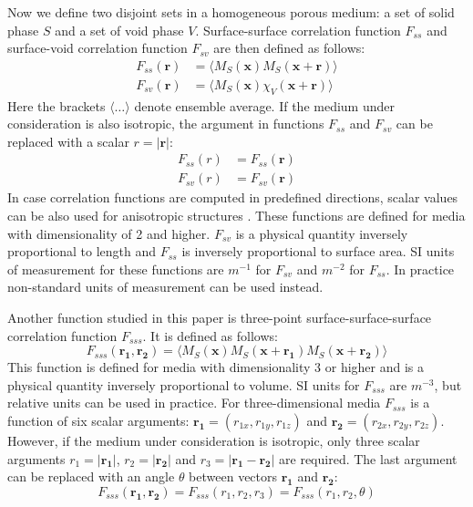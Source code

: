 \documentclass[1p]{elsarticle}
\begin{document}
Now we define two disjoint sets in a homogeneous porous medium: a set of solid
phase $S$ and a set of void phase $V$. Surface-surface correlation function
$F_{ss}$ and surface-void correlation function $F_{sv}$ are then defined as
follows: \cite{Torquato_book}
\begin{align}
  F_{ss}(\bm{r}) &= \langle M_S(\bm{x}) M_S(\bm{x} + \bm{r}) \rangle \label{eq:fss} \\
  F_{sv}(\bm{r}) &= \langle M_S(\bm{x}) \chi_V(\bm{x} + \bm{r}) \rangle
  \label{eq:fsv}
\end{align}
Here the brackets $\langle \dots \rangle$ denote ensemble average. If the medium
under consideration is also isotropic, the argument in functions $F_{ss}$ and
$F_{sv}$ can be replaced with a scalar $r = |\bm{r}|$:
\begin{align}
  F_{ss}(r) &= F_{ss}(\bm{r}) \\
  F_{sv}(r) &= F_{sv}(\bm{r})
\end{align}
In case correlation functions are computed in predefined directions, scalar
values can be also used for anisotropic structures
\cite{jiao2014chawla,EPL1}. These functions are defined for media with
dimensionality of 2 and higher. $F_{sv}$ is a physical quantity inversely
proportional to length and $F_{ss}$ is inversely proportional to surface
area. SI units of measurement for these functions are $m^{-1}$ for $F_{sv}$
and $m^{-2}$ for $F_{ss}$. In practice non-standard units of measurement can be
used instead.

Another function studied in this paper is three-point surface-surface-surface
correlation function $F_{sss}$. It is defined as follows:
\begin{equation}
  F_{sss}(\bm{r_1}, \bm{r_2}) = \langle M_S(\bm{x}) M_S(\bm{x} + \bm{r_1})
  M_S(\bm{x} + \bm{r_2}) \rangle
  \label{eq:fsss}
\end{equation}
This function is defined for media with dimensionality 3 or higher and is a
physical quantity inversely proportional to volume. SI units for $F_{sss}$ are
$m^{-3}$, but relative units can be used in practice. For three-dimensional media
$F_{sss}$ is a function of six scalar arguments:
$\bm{r_1} = (r_{1x}, r_{1y}, r_{1z})$ and $\bm{r_2} = (r_{2x}, r_{2y}, r_{2z})$.
However, if the medium under consideration is isotropic, only three scalar
arguments $r_1 = |\bm{r_1}|$, $r_2 = |\bm{r_2}|$ and $r_3 = |\bm{r_1} - \bm{r_2}|$
are required. The last argument can be replaced with an angle $\theta$ between
vectors $\bm{r_1}$ and $\bm{r_2}$:
\begin{equation}
  F_{sss}(\bm{r_1}, \bm{r_2}) = F_{sss}(r_1, r_2, r_3) = F_{sss}(r_1, r_2, \theta)
\end{equation}
\end{document}
